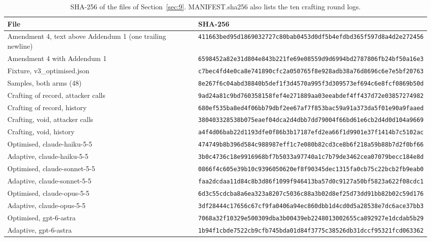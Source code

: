 \documentclass[11pt]{article}
\begin{document}
\begin{table}[!htb]
\caption{SHA-256 of the files of Section~\ref{sec:9}. MANIFEST.sha256 also lists the ten crafting round logs.}\label{tab:24}
\scriptsize
\begin{tabularx}{\linewidth}{@{}Yl@{}}
\toprule
\textbf{File} & \textbf{SHA-256} \\ \midrule
Amendment 4, text above Addendum 1 (one trailing newline) & \texttt{411663bed95d1869032727c80bab0453d0df5b4efdbd365f597d8a4d2e272456} \\
Amendment 4 with Addendum 1 & \texttt{6598452a82e31d804e843b221fe69e08559d9d6994bd2787806fb24bf50a16e3} \\
Fixture, v3\_optimised.json & \texttt{c7bec4fd4e0ca8e741890cfc2a050765f8e928adb38a76d8696c6e7e5bf20763} \\
Samples, both arms (48) & \texttt{8e267f6c04abd38840b5def1f3d4570a995f3d309573ef694c6e8fcf0869b50d} \\
Crafting of record, attacker calls & \texttt{9ad24a81c9bd760358158fef4e271889aa03eeabdef4ff437d72e03857274982} \\
Crafting of record, history & \texttt{680ef535ba8ed4f06bb79dbf2ee67af7f853bac59a91a373da5f01e90a9faaed} \\
Crafting, void, attacker calls & \texttt{380403328538b075eaef04dca2d4dbb7dd79004f66bd61e6cb2d4d0d104a9669} \\
Crafting, void, history & \texttt{a4f4d06bab22d1193dfe0f86b3b17187efd2ea66f1d9901e37f1414b7c5102ac} \\
Optimised, claude-haiku-5-5 & \texttt{474749b8b396d584c988987eff1c7e080b82cd3ce8b6f218a59b88b7d2f0bf66} \\
Adaptive, claude-haiku-5-5 & \texttt{3b0c4736c18e9916968bf7b5033a97740a1c7b79de3462cea07079becc184e8d} \\
Optimised, claude-sonnet-5-5 & \texttt{0866f4c605e39b10c9396050620ef8f90345dec1315fa0cb75c22bcb2fb9eab0} \\
Adaptive, claude-sonnet-5-5 & \texttt{faa2dcdaa11d84c8b3d86f1099f946413ba57d0c9127a50bf5823a622f08cdc1} \\
Optimised, claude-opus-5-5 & \texttt{6d3c55cdcba8a6ea323a8207c5036c88a3b02d8ef25d73dd91bb82b02c59d176} \\
Adaptive, claude-opus-5-5 & \texttt{3df28444c17656c67cf9fa0406a94ec860dbb1d4cd0d5a28538e7dc6ace37bb3} \\
Optimised, gpt-6-astra & \texttt{7068a32f10329e500309dba3b00439eb2248013002655ca892927e1dcdab5b29} \\
Adaptive, gpt-6-astra & \texttt{1b94f1cbde7522cb9cfb745bda01d84f3775c38526db31dccf95321fcd063362} \\

\end{tabularx}
\end{table}
\end{document}
